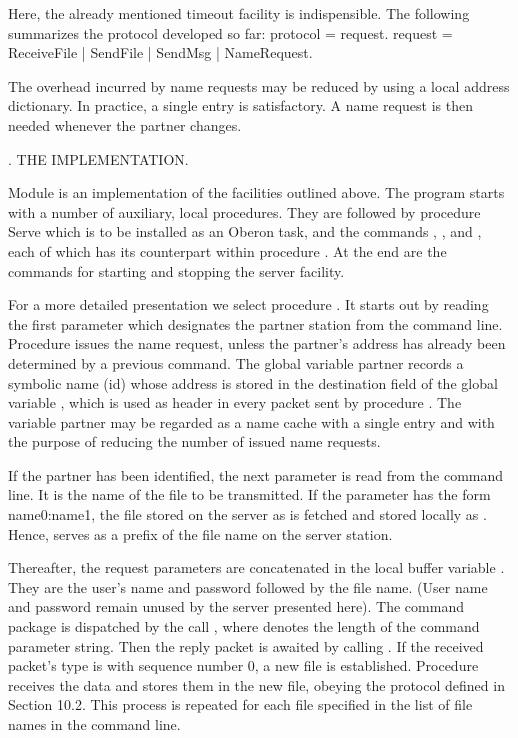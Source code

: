 \noindent Here, the already mentioned timeout facility is indispensible. The following summarizes the protocol developed so far:
\begintt
protocol = {request}.
request = ReceiveFile | SendFile | SendMsg | NameRequest.
\endtt

\noindent The overhead incurred by name requests may be reduced by using a local address dictionary. In practice, a single entry is satisfactory. A name request is then needed whenever the partner changes.

. THE IMPLEMENTATION.

Module  is an implementation of the facilities outlined above. The program starts with a number of auxiliary, local procedures. They are followed by procedure Serve which is to be installed as an Oberon task, and the commands , , and , each of which has its counterpart within procedure . At the end are the commands for starting and stopping the server facility.

For a more detailed presentation we select procedure . It starts out by reading the first parameter which designates the partner station from the command line. Procedure  issues the name request, unless the partner's address has already been determined by a previous command. The global variable partner records a symbolic name (id) whose address is stored in the destination field of the global variable , which is used as header in every packet sent by procedure . The variable partner may be regarded as a name cache with a single entry and with the purpose of reducing the number of issued name requests.

If the partner has been identified, the next parameter is read from the command line. It is the name of the file to be transmitted. If the parameter has the form name0:name1, the file stored on the server as  is fetched and stored locally as . Hence,  serves as a prefix of the file name on the server station.

Thereafter, the request parameters are concatenated in the local buffer variable . They are the user's name and password followed by the file name. (User name and password remain unused by the server presented here). The command package is dispatched by the call , where  denotes the length of the command parameter string. Then the reply packet is awaited by calling . If the received packet's type is  with sequence number 0, a new file is established. Procedure  receives the data and stores them in the new file, obeying the protocol defined in Section 10.2. This process is repeated for each file specified in the list of file names in the command line.

